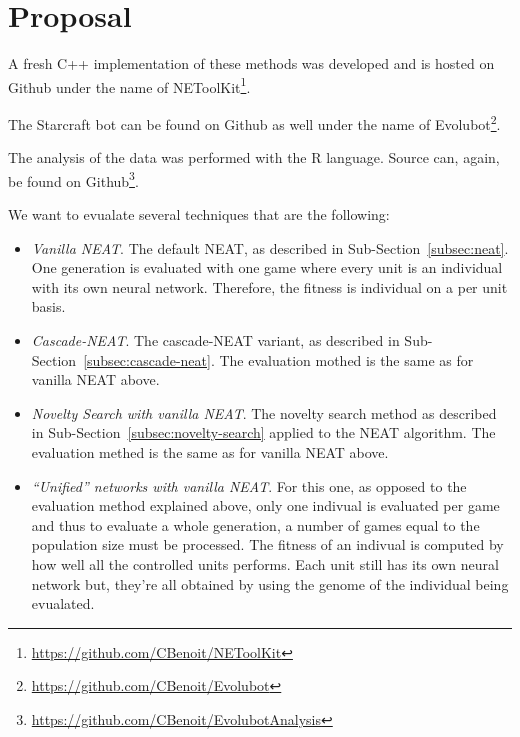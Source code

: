 \section{Proposal}\label{section:proposal}

A fresh C++ implementation of these methods was developed and is hosted on Github under the name of NEToolKit\footnote{\url{https://github.com/CBenoit/NEToolKit}}.

The Starcraft bot can be found on Github as well under the name of Evolubot\footnote{\url{https://github.com/CBenoit/Evolubot}}.

The analysis of the data was performed with the R language. Source can, again, be found on Github\footnote{\url{https://github.com/CBenoit/EvolubotAnalysis}}.

We want to evualate several techniques that are the following:
\begin{itemize}
    \item \emph{Vanilla NEAT}. The default NEAT, as described in Sub-Section~\ref{subsec:neat}. One generation is evaluated with one game
        where every unit is an individual with its own neural network. Therefore, the fitness is individual on a per unit basis.
    \item \emph{Cascade-NEAT}. The cascade-NEAT variant, as described in Sub-Section~\ref{subsec:cascade-neat}.
        The evaluation mothed is the same as for vanilla NEAT above.
    \item \emph{Novelty Search with vanilla NEAT}. The novelty search method as described in Sub-Section~\ref{subsec:novelty-search} applied to the NEAT algorithm.
        The evaluation methed is the same as for vanilla NEAT above.
    \item \emph{``Unified'' networks with vanilla NEAT}. For this one, as opposed to the evaluation method explained above, only one indivual is
        evaluated per game and thus to evaluate a whole generation, a number of games equal to the population size must be processed.
        The fitness of an indivual is computed by how well all the controlled units performs. Each unit still has its own neural network
        but, they're all obtained by using the genome of the individual being evualated.
\end{itemize}

